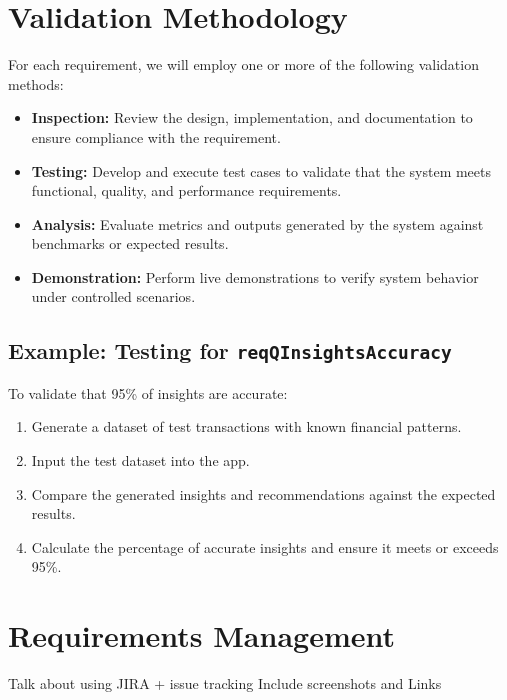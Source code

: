 \section{Validation Methodology}

For each requirement, we will employ one or more of the following validation methods:

\begin{itemize}
    \item \textbf{Inspection:} Review the design, implementation, and documentation to ensure compliance with the requirement.
    \item \textbf{Testing:} Develop and execute test cases to validate that the system meets functional, quality, and performance requirements.
    \item \textbf{Analysis:} Evaluate metrics and outputs generated by the system against benchmarks or expected results.
    \item \textbf{Demonstration:} Perform live demonstrations to verify system behavior under controlled scenarios.
\end{itemize}

\subsection{Example: Testing for \texttt{reqQInsightsAccuracy} }
To validate that 95\% of insights are accurate:
\begin{enumerate}
    \item Generate a dataset of test transactions with known financial patterns.
    \item Input the test dataset into the app.
    \item Compare the generated insights and recommendations against the expected results.
    \item Calculate the percentage of accurate insights and ensure it meets or exceeds 95\%.
\end{enumerate}


\section{Requirements Management}
Talk about using JIRA + issue tracking 
Include screenshots and Links 